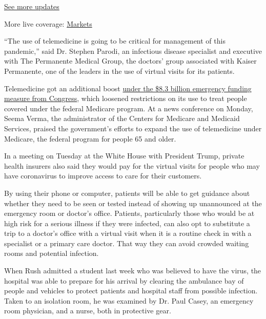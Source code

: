 \href{https://www.nytimes3xbfgragh.onion/2020/08/03/world/coronavirus-covid-19.html?action=click\&pgtype=Article\&state=default\&region=MAIN_CONTENT_1\&context=storylines_live_updates}{See
more updates}

More live coverage:
\href{https://www.nytimes3xbfgragh.onion/live/2020/08/03/business/stock-market-today-coronavirus?action=click\&pgtype=Article\&state=default\&region=MAIN_CONTENT_1\&context=storylines_live_updates}{Markets}

``The use of telemedicine is going to be critical for management of this
pandemic,'' said Dr. Stephen Parodi, an infectious disease specialist
and executive with The Permanente Medical Group, the doctors' group
associated with Kaiser Permanente, one of the leaders in the use of
virtual visits for its patients.

Telemedicine got an additional boost
\href{https://www.nytimes3xbfgragh.onion/2020/03/04/us/politics/coronavirus-emergency-aid-congress.html}{under
the \$8.3 billion emergency funding measure from Congress}, which
loosened restrictions on its use to treat people covered under the
federal Medicare program. At a news conference on Monday, Seema Verma,
the administrator of the Centers for Medicare and Medicaid Services,
praised the government's efforts to expand the use of telemedicine under
Medicare, the federal program for people 65 and older.

In a meeting on Tuesday at the White House with President Trump, private
health insurers also said they would pay for the virtual visits for
people who may have coronavirus to improve access to care for their
customers.

By using their phone or computer, patients will be able to get guidance
about whether they need to be seen or tested instead of showing up
unannounced at the emergency room or doctor's office. Patients,
particularly those who would be at high risk for a serious illness if
they were infected, can also opt to substitute a trip to a doctor's
office with a virtual visit when it is a routine check in with a
specialist or a primary care doctor. That way they can avoid crowded
waiting rooms and potential infection.

When Rush admitted a student last week who was believed to have the
virus, the hospital was able to prepare for his arrival by clearing the
ambulance bay of people and vehicles to protect patients and hospital
staff from possible infection. Taken to an isolation room, he was
examined by Dr. Paul Casey, an emergency room physician, and a nurse,
both in protective gear.

